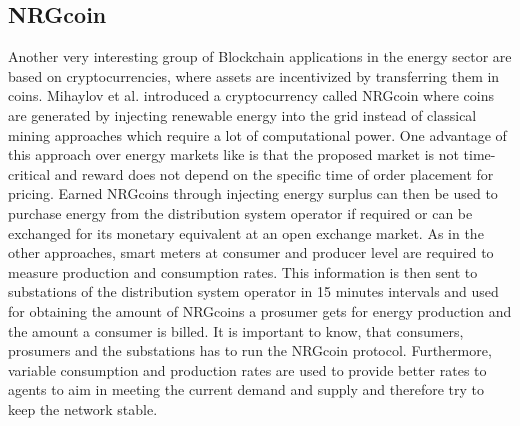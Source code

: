 \documentclass[runningheads]{llncs}
\begin{document}
\subsection{NRGcoin}
Another very interesting group of Blockchain applications in the energy sector are based on cryptocurrencies, where assets are incentivized by transferring them in coins.
Mihaylov et al. \cite{mihaylov_nrgcoin} introduced a cryptocurrency called NRGcoin where coins are generated by injecting renewable energy into the grid instead of classical mining approaches which require a lot of computational power. One advantage of this approach over energy markets like \cite{123} \cite{456} is that the proposed market is not time-critical and reward does not depend on the specific time of order placement for pricing. 
Earned NRGcoins through injecting energy surplus can then be used to purchase energy from the distribution system operator if required or can be exchanged for its monetary equivalent at an open exchange market. \newline
As in the other approaches, smart meters at consumer and producer level are required to measure production and consumption rates. This information is then sent to substations of the distribution system operator in 15 minutes intervals and used for obtaining the amount of NRGcoins a prosumer gets for energy production and the amount a consumer is billed.
It is important to know, that consumers, prosumers and the substations has to run the NRGcoin protocol. Furthermore, variable consumption and production rates are used to provide better rates to agents to aim in meeting the current demand and supply and therefore try to keep the network stable. \cite{mihaylov_nrgcoin}
\end{document}
